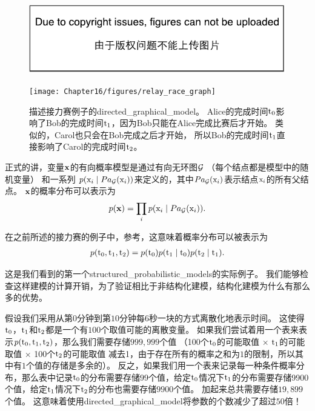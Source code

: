 \begin{figure}[!htb]
\ifOpenSource
\centerline{\includegraphics{figure.pdf}}
\else
\centerline{\texttt{[image: Chapter16/figures/relay\_race\_graph]}}	
\fi
\caption{描述接力赛例子的\gls{directed_graphical_model}。
Alice的完成时间$\mathrm{t}_0$影响了Bob的完成时间$\mathrm{t}_1$，因为Bob只能在Alice完成比赛后才开始。
类似的，Carol也只会在Bob完成之后才开始，
所以Bob的完成时间$\mathrm{t}_1$直接影响了Carol的完成时间$\mathrm{t}_2$。}
\label{fig:relay_race_graph}
\end{figure}


正式的讲，变量$\mathbf{x}$的有向概率模型是通过有向无环图$\mathcal{G}$ （每个结点都是模型中的随机变量）
和一系列 $p(\mathrm{x}_i\mid Pa_{\mathcal{G}}(\mathrm{x}_i))$来定义的，其中$Pa_{\mathcal{G}}(\mathrm{x}_i)$表示结点$\mathrm{x}_i$的所有父结点。
$\mathbf{x}$的概率分布可以表示为
\begin{align}
\label{eqn:161}
p(\mathbf{x}) = \prod_{i} p(\mathrm{x}_i\mid Pa_{\mathcal{G}}(\mathrm{x}_i)).
\end{align}


在之前所述的接力赛的例子中，参考，这意味着概率分布可以被表示为
\begin{align}
\label{eqn:162}
p(\mathrm{t}_0,\mathrm{t}_1,\mathrm{t}_2) = p(\mathrm{t}_0)p(\mathrm{t}_1\mid \mathrm{t}_0)p(\mathrm{t}_2\mid \mathrm{t}_1).
\end{align}


这是我们看到的第一个\gls{structured_probabilistic_models}的实际例子。
我们能够检查这样建模的计算开销，为了验证相比于非结构化建模，结构化建模为什么有那么多的优势。


假设我们采用从第$0$分钟到第$10$分钟每$6$秒一块的方式离散化地表示时间。
这使得$\mathrm{t}_0$，$\mathrm{t}_1$和$\mathrm{t}_2$都是一个有$100$个取值可能的离散变量。
如果我们尝试着用一个表来表示$p(\mathrm{t}_0, \mathrm{t}_1, \mathrm{t}_2)$，那么我们需要存储$999,999$个值
（100个$\mathrm{t}_0$的可能取值 $\times$ $\mathrm{t}_1$的可能取值 $\times$ 100个$\mathrm{t}_2$的可能取值 减去1，由于存在所有的概率之和为$1$的限制，所以其中有$1$个值的存储是多余的）。
反之，如果我们用一个表来记录每一种条件概率分布，那么表中记录$\mathrm{t}_0$的分布需要存储$99$个值，给定$\mathrm{t}_0$情况下$\mathrm{t}_1$的分布需要存储9900个值，给定$\mathrm{t}_1$情况下$\mathrm{t}_2$的分布也需要存储$9900$个值。
加起来总共需要存储$19, 899$个值。
这意味着使用\gls{directed_graphical_model}将参数的个数减少了超过$50$倍！


